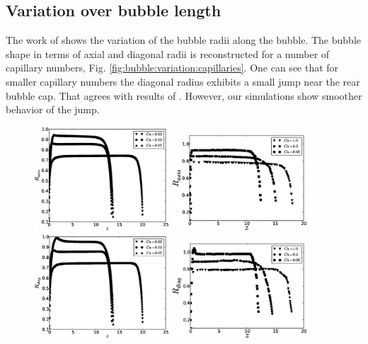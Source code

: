\documentclass[preprint,12pt]{elsarticle}
\begin{document}
\subsection{Variation over bubble length}
The work of \citet{wang-non-circular} shows the variation of the bubble
radii along the
bubble. The bubble shape in terms of axial and diagonal radii is reconstructed for a number of
capillary numbers, Fig. \ref{fig:bubble:variation:capillaries}. One can see that for smaller
capillary numbers the diagonal radius exhibits a small jump near the rear bubble cap. That agrees
with results of \citet{wang-non-circular}. However, our simulations show smoother behavior of
the jump.  
\begin{figure}[htb!]
\includegraphics[width=0.45\textwidth]{bubble_rad_axis.eps}\hfill
\includegraphics[width=0.45\textwidth]{bubble_wang_axis.eps}\\
\includegraphics[width=0.45\textwidth]{bubble_rad_diag.eps}\hfill
\includegraphics[width=0.45\textwidth]{bubble_wang_diag.eps}\\

\end{figure}
\end{document}
